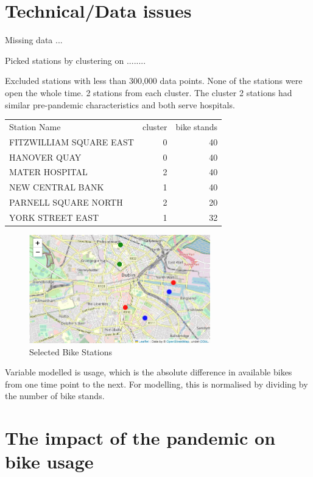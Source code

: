 \documentclass[12pt,letterpaper]{article}
\begin{document}
\section{Technical/Data issues}
Missing data ...




Picked stations by clustering on ........

Excluded stations with less than 300,000 data points.   None of the stations were open the whole time.
2 stations from each cluster.  The cluster 2 stations had similar pre-pandemic characteristics and both serve hospitals.%

\begin{table}[h]
	\centering
	\begin{tabular}{|l|r|r|}
		Station Name & cluster & bike stands\\
		FITZWILLIAM SQUARE EAST & 0 & 40\\
		HANOVER QUAY & 0 & 40\\
		MATER HOSPITAL & 2 & 40\\
		NEW CENTRAL BANK & 1 & 40 \\
		PARNELL SQUARE NORTH & 2 & 20\\
		YORK STREET EAST & 1 & 32 \\
		
	\end{tabular} 
\end{table}


\begin{figure}[!htbp]
	\includegraphics[width=0.7\textwidth]{../graphs/bikeStationMap.png}
	\caption{Selected Bike Stations}
	\label{fig:stations}
\end{figure}

Variable modelled is usage, which is the absolute difference in available bikes from one time point to the next.  For modelling, this is normalised by dividing by the number of bike stands.


\section{The impact of the pandemic on bike usage}
\end{document}
